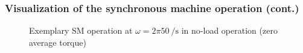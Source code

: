 \begin{frame}
	\frametitle{Visualization of the synchronous machine operation (cont.)}
    \vspace{-0.275cm}
    \begin{figure}
        \centering
        \vspace{-0.25cm}
        \caption{Exemplary SM operation at $\omega=2 \pi \SI{50}{\per\second}$ in no-load operation (zero average torque)}
        \label{fig:SM_load_angle_0_animation}
    \end{figure}
\end{frame}

